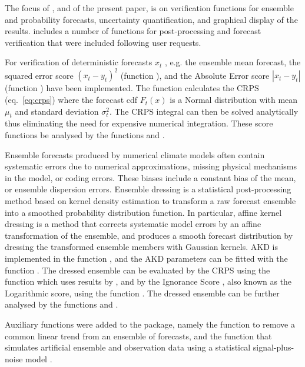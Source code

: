 \documentclass[article]{jss}\usepackage[]{graphicx}\usepackage[]{color}
\begin{document}
The focus of , and of the present paper, is on verification functions for ensemble and probability forecasts, uncertainty quantification, and graphical display of the results.
 includes a number of functions for post-processing and forecast verification that were included following user requests.


For verification of deterministic forecasts $x_t$ , e.g. the ensemble mean forecast, the squared error score $(x_t - y_t)^2$ (function ), and the Absolute Error score $|x_t - y_t|$ (function ) have been implemented.
The function  calculates the CRPS (eq.~\ref{eq:crps}) where the forecast cdf $F_t(x)$ is a Normal distribution with mean $\mu_t$ and standard deviation $\sigma^2_t$.
The CRPS integral can then be solved analytically \citep{gneiting2005calibrated} thus eliminating the need for expensive numerical integration.
These score functions be analysed by the functions  and .


Ensemble forecasts produced by numerical climate models often contain systematic errors due to numerical approximations, missing physical mechanisms in the model, or coding errors.
These biases include a constant bias of the mean, or ensemble dispersion errors.
Ensemble dressing is a statistical post-processing method based on kernel density estimation to transform a raw forecast ensemble into a smoothed probability distribution function.
In particular, affine kernel dressing \citep[AKD; ][]{broecker2008from} is a method that corrects systematic model errors by an affine transformation of the ensemble, and produces a smooth forecast distribution by dressing the transformed ensemble members with Gaussian kernels.
AKD is implemented in the function , and the AKD parameters can be fitted with the function . 
The dressed ensemble can be evaluated by the CRPS using the function  which uses results by \citet{grimit2006the}, and by the Ignorance Score \citep{roulston2002evaluating}, also known as the Logarithmic score, using the function .
The dressed ensemble can be further analysed by the functions  and .

Auxiliary functions were added to the package, namely the function  to remove a common linear trend from an ensemble of forecasts, and the function  that simulates artificial ensemble and observation data using a statistical signal-plus-noise model \citep{siegert2016bayesian}.
\end{document}
